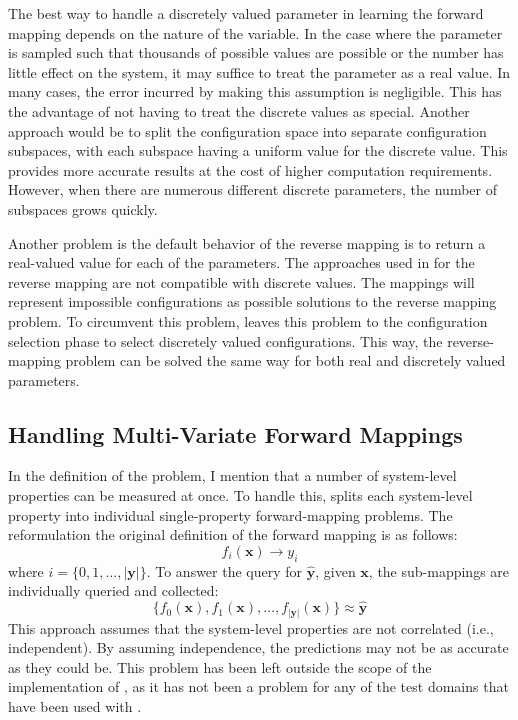 The best way to handle a discretely valued parameter in learning the forward mapping depends on the nature of the variable.
In the case where the parameter is sampled such that thousands of possible values are possible or the number has little effect on the system, it may suffice to treat the parameter as a real value.
In many cases, the error incurred by making this assumption is negligible.
This has the advantage of not having to treat the discrete values as special.
Another approach would be to split the configuration space into separate configuration subspaces, with each subspace having a uniform value for the discrete value.
This provides more accurate results at the cost of higher computation requirements.
However, when there are numerous different discrete parameters, the number of subspaces grows quickly.


Another problem is the default behavior of the reverse mapping is to return a real-valued value for each of the parameters.
The approaches used in \fw for the reverse mapping are not compatible with discrete values.
The mappings will represent impossible configurations as possible solutions to the reverse mapping problem.
To circumvent this problem, \fw leaves this problem to the configuration selection phase to select discretely valued configurations.
This way, the reverse-mapping problem can be solved the same way for both real and discretely valued parameters.

\subsection{Handling Multi-Variate Forward Mappings}

In the definition of the problem, I mention that a number of system-level properties can be measured at once.
To handle this, \fw splits each system-level property into individual single-property forward-mapping problems.
The reformulation the original definition of the forward mapping is as follows:
\[ f_i(\mathbf x) \rightarrow y_i \]
where $i = \{0, 1, \ldots, |\mathbf y|\}$.
To answer the  query for $\hat{\mathbf y}$, given $\mathbf x$, the sub-mappings are individually queried and collected:
\[ \{f_0(\mathbf x), f_1(\mathbf x), \ldots, f_{|\mathbf y|}(\mathbf x)\} \approx \hat{\mathbf y} \]
This approach assumes that the system-level properties are not correlated (i.e., independent).
By assuming independence, the predictions may not be as accurate as they could be.
This problem has been left outside the scope of the implementation of \fw, as it has not been a problem for any of the test domains that have been used with \fw.



